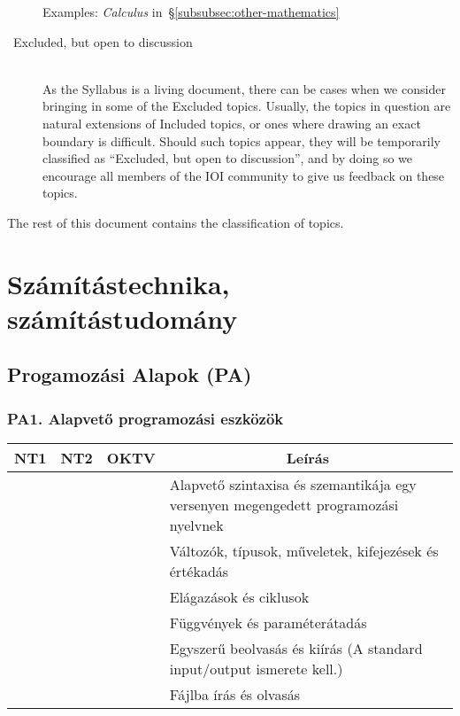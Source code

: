 \documentclass[a4paper,11pt,oneside]{article}
\newcommand{\cmark}{\ding{51}}%
\newcommand{\xmark}{\ding{55}}%
\newcommand{\cincl}{{\small\cmark}}
\newcommand{\cemay}{{\small\xmark\faQuestionCircle}}
\newcommand{\Ctable}[1]{
    \begin{center}
        \begin{tabular}{ | C | C | C | m{8cm} | }
        \hline
        \textbf{NT1} & \textbf{NT2} & \textbf{OKTV} & \multicolumn{1}{|c|}{\textbf{Leírás}} \\ \hline
        #1
        \end{tabular}
    \end{center}    
}
\begin{document}
\begin{description}
    Examples: \emph{Calculus\/} in~\S\ref{subsubsec:other-mathematics}

\item[\cemay\ Excluded, but open to discussion]~\\
    As the Syllabus is a living document, there can be cases when we consider
    bringing in some of the Excluded topics. Usually, the topics in question
    are natural extensions of Included topics, or ones where drawing an exact
    boundary is difficult. Should such topics appear, they will be temporarily
    classified as ``Excluded, but open to discussion'', and by doing so we encourage 
    all members of the IOI community to give us feedback on these topics.
\end{description}

\bigskip

\noindent
The rest of this document contains the classification of topics.


\section {Számítástechnika, számítástudomány} %
\label{subsec:computing-science}

\subsection {Progamozási Alapok (PA)} %
\label{subsubsec:PF}

    \subsubsection*{PA1. Alapvető programozási eszközök} %

    \Ctable {
        \cincl & \cincl & \cincl &
        Alapvető szintaxisa és szemantikája egy versenyen megengedett programozási nyelvnek \\ \hline
        
        \cincl & \cincl & \cincl &
        Változók, típusok, műveletek, kifejezések és értékadás \\ \hline
        
        \cincl & \cincl & \cincl &
        Elágazások és ciklusok \\ \hline
        
        \cincl & \cincl & \cincl &
        Függvények és paraméterátadás \\ \hline
        
        \cincl & \cincl & \cincl &
        Egyszerű beolvasás és kiírás (A standard input/output ismerete kell.) \\ \hline
        
        \cemay & \cemay & \cemay &
        Fájlba írás és olvasás \\ \hline
    }
\end{document}
